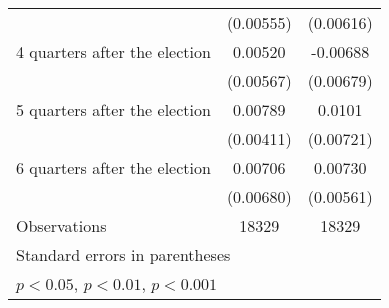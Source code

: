 \begin{table}[htbp]
\begin{tabular}{l*{2}{c}}
                    &   (0.00555)         &   (0.00616)         \\
[1em]
 4 quarters after the election&     0.00520         &    -0.00688         \\
                    &   (0.00567)         &   (0.00679)         \\
[1em]
 5 quarters after the election&     0.00789         &      0.0101         \\
                    &   (0.00411)         &   (0.00721)         \\
[1em]
 6 quarters after the election&     0.00706         &     0.00730         \\
                    &   (0.00680)         &   (0.00561)         \\
\hline
Observations        &       18329         &       18329         \\
\hline\hline
\multicolumn{3}{l}{\footnotesize Standard errors in parentheses}\\
\multicolumn{3}{l}{\footnotesize \sym{*} \(p<0.05\), \sym{**} \(p<0.01\), \sym{***} \(p<0.001\)}\\
\end{tabular}
\end{table}
